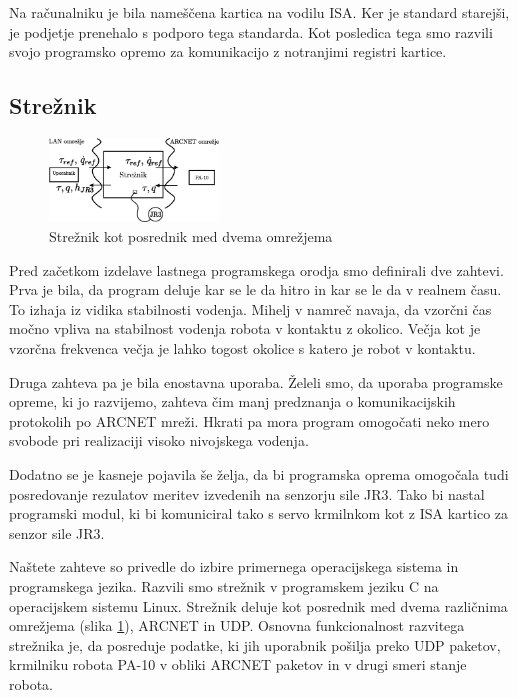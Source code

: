 \documentclass[a4paper]{article}
\begin{document}
Na računalniku je bila nameščena kartica na vodilu ISA. Ker je standard starejši, je podjetje prenehalo s podporo tega standarda. Kot posledica tega smo razvili svojo programsko opremo za komunikacijo z notranjimi registri kartice.

\subsection{Strežnik} \label{sec:streznik}

\begin{figure}[!t]
	\centering
	\includegraphics[width=0.4\textwidth]{./slike/udp-arcnet-server.eps}
	\caption{Strežnik kot posrednik med dvema omrežjema}
	\label{fig:udp-server-server}
\end{figure}

Pred začetkom izdelave lastnega programskega orodja smo definirali dve zahtevi. Prva je bila, da program deluje kar se le da hitro in kar se le da v realnem času. To izhaja iz vidika stabilnosti vodenja. Mihelj v \cite{mihelj_hapt} namreč navaja, da vzorčni čas močno vpliva na stabilnost vodenja robota v kontaktu z okolico. Večja kot je vzorčna frekvenca večja je lahko togost okolice s katero je robot v kontaktu.

Druga zahteva pa je bila enostavna uporaba. Želeli smo, da uporaba programske opreme, ki jo razvijemo, zahteva čim manj predznanja o komunikacijskih protokolih po ARCNET mreži. Hkrati pa mora program omogoča\-ti neko mero svobode pri realizaciji visoko nivojskega vodenja.

Dodatno se je kasneje pojavila še želja, da bi programska oprema omogočala tudi posredovanje rezulatov meritev izvedenih na senzorju sile JR3. Tako bi nastal programski modul, ki bi komuniciral tako s servo krmilnkom kot z ISA kartico za senzor sile JR3.

Naštete zahteve so privedle do izbire primernega operacijskega sistema in programskega jezika. Razvili smo strežnik v programskem jeziku C na operacijskem sistemu Linux. Strežnik deluje kot posrednik med dvema različnima omrežjema (slika \ref{fig:udp-server-server}), ARCNET in UDP. Osno\-vna funkcionalnost razvitega strežnika je, da posreduje podatke, ki jih uporabnik pošilja preko UDP paketov, krmilniku robota PA-10 v obliki ARCNET paketov in v drugi smeri stanje robota. 
\end{document}
